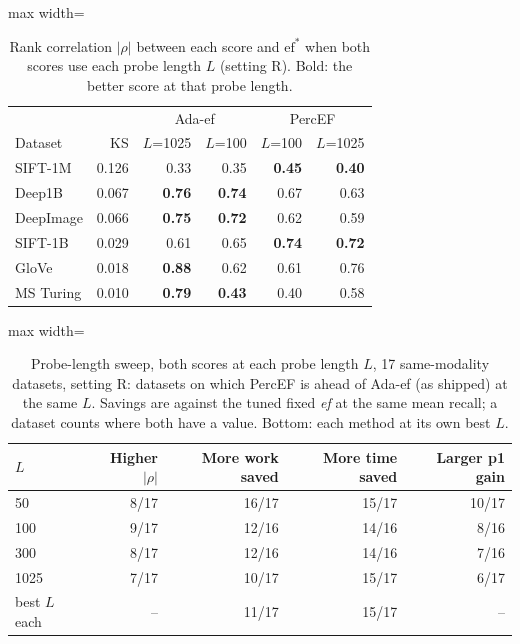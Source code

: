 \documentclass[twocolumn]{svjour3}
\newcommand{\ef}{\textit{ef}}
\begin{document}
\begin{table}[t]
  \caption{Rank correlation $|\rho|$ between each score and $\mathrm{ef}^*$ when both scores use
  each probe length $L$ (setting R). Bold: the better score at that probe length.}
  \label{tab:ablation}
  \centering\footnotesize
  \begin{adjustbox}{max width=\linewidth}\begin{tabular}{lrrrrr}
    \toprule
    & & \multicolumn{2}{c}{Ada-ef} & \multicolumn{2}{c}{PercEF} \\
    Dataset & KS & $L$=1025 & $L$=100 & $L$=100 & $L$=1025 \\
    \midrule
    SIFT-1M   & 0.126 & 0.33 & 0.35 & \textbf{0.45} & \textbf{0.40} \\
    Deep1B    & 0.067 & \textbf{0.76} & \textbf{0.74} & 0.67 & 0.63 \\
    DeepImage & 0.066 & \textbf{0.75} & \textbf{0.72} & 0.62 & 0.59 \\
    SIFT-1B   & 0.029 & 0.61 & 0.65 & \textbf{0.74} & \textbf{0.72} \\
    GloVe     & 0.018 & \textbf{0.88} & 0.62 & 0.61 & 0.76 \\
    MS Turing & 0.010 & \textbf{0.79} & \textbf{0.43} & 0.40 & 0.58 \\
    \bottomrule
  \end{tabular}\end{adjustbox}
\end{table}

\begin{table}[t]
  \caption{Probe-length sweep, both scores at each probe length $L$, 17 same-modality datasets,
  setting R: datasets on which PercEF is ahead of Ada-ef (as shipped) at the same $L$. Savings are
  against the tuned fixed \ef{} at the same mean recall; a dataset counts where both have a value.
  Bottom: each method at its own best $L$.}
  \label{tab:probes}
  \centering\footnotesize\setlength{\tabcolsep}{3.5pt}
  \begin{adjustbox}{max width=\linewidth}\begin{tabular}{lrrrr}
    \toprule
    $L$ & Higher $|\rho|$ & More work saved & More time saved & Larger p1 gain \\
    \midrule
    50   &  8/17 & 16/17 & 15/17 & 10/17 \\
    100  &  9/17 & 12/16 & 14/16 &  8/16 \\
    300  &  8/17 & 12/16 & 14/16 &  7/16 \\
    1025 &  7/17 & 10/17 & 15/17 &  6/17 \\
    \midrule
    best $L$ each & -- & 11/17 & 15/17 & -- \\
    \bottomrule
  \end{tabular}\end{adjustbox}
\end{table}
\end{document}
